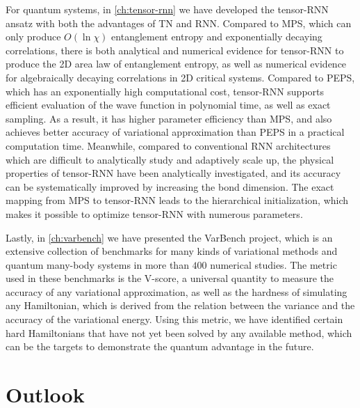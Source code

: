 For quantum systems, in \cref{ch:tensor-rnn} we have developed the tensor-RNN ansatz with both the advantages of TN and RNN. Compared to MPS, which can only produce $O(\ln \chi)$ entanglement entropy and exponentially decaying correlations, there is both analytical and numerical evidence for tensor-RNN to produce the 2D area law of entanglement entropy, as well as numerical evidence for algebraically decaying correlations in 2D critical systems. Compared to PEPS, which has an exponentially high computational cost, tensor-RNN supports efficient evaluation of the wave function in polynomial time, as well as exact sampling. As a result, it has higher parameter efficiency than MPS, and also achieves better accuracy of variational approximation than PEPS in a practical computation time. Meanwhile, compared to conventional RNN architectures which are difficult to analytically study and adaptively scale up, the physical properties of tensor-RNN have been analytically investigated, and its accuracy can be systematically improved by increasing the bond dimension. The exact mapping from MPS to tensor-RNN leads to the hierarchical initialization, which makes it possible to optimize tensor-RNN with numerous parameters.

Lastly, in \cref{ch:varbench} we have presented the VarBench project, which is an extensive collection of benchmarks for many kinds of variational methods and quantum many-body systems in more than $400$ numerical studies. The metric used in these benchmarks is the V-score, a universal quantity to measure the accuracy of any variational approximation, as well as the hardness of simulating any Hamiltonian, which is derived from the relation between the variance and the accuracy of the variational energy. Using this metric, we have identified certain hard Hamiltonians that have not yet been solved by any available method, which can be the targets to demonstrate the quantum advantage in the future.

\section{Outlook}

